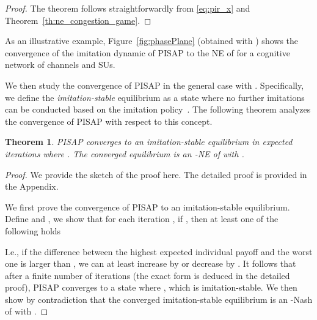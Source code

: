 \documentclass[12pt, onecolumn]{IEEEtran}
\theoremstyle{plain}
\newtheorem{theorem}{Theorem}
\theoremstyle{definition}
\begin{document}
\begin{proof}
The theorem follows straightforwardly from \eqref{eq:pir_x} and Theorem~\ref{th:ne_congestion_game}.
\end{proof}

\begin{comment}

\begin{figure}
\centering
\texttt{[image: aggrPhasePlane.eps]}
\caption{Phase plane of the imitation dynamic of PISAP for ,  and }
\label{fig:phasePlane}
\vspace{1.5cm}
\end{figure}

\end{comment}

As an illustrative example, Figure~\ref{fig:phasePlane} (obtained with \cite{Polkingpplane}) shows the convergence of the imitation dynamic of PISAP to the NE of  for a cognitive network of  channels and  SUs.

We then study the convergence of PISAP in the general case with . Specifically, we define the \textit{imitation-stable} equilibrium as a state where no further imitations can be conducted based on the imitation policy~\cite{Ackermann09}. The following theorem analyzes the convergence of PISAP with respect to this concept.

\begin{theorem}
\label{th:convergence_simple}
PISAP converges to an imitation-stable equilibrium in expected  iterations where . The converged equilibrium is an -NE of  with .
\end{theorem}

\begin{proof}
We provide the sketch of the proof here. The detailed proof is provided in the Appendix.

We first prove the convergence of PISAP to an imitation-stable equilibrium. Define  and , we show that for each iteration , if , then at least one of the following holds

I.e., if the difference between the highest expected individual payoff  and the worst one  is larger than , we can at least increase  by  or decrease  by . It follows that after a finite number of iterations (the exact form is deduced in the detailed proof), PISAP converges to a state where , which is imitation-stable. We then show by contradiction that the converged imitation-stable equilibrium is an -Nash of  with .
\end{proof}
\end{document}
